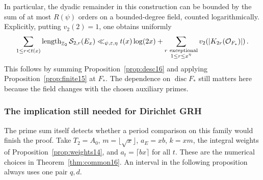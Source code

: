 \documentclass[a4paper,11pt]{article}
\theoremstyle{definition}
\theoremstyle{remark}
\newcommand{\ZZ}{\mathbb Z}\newcommand{\ord}{\operatorname{ord}}
\newcommand{\len}{\operatorname{length}}\newcommand{\Res}{\operatorname*{Res}}
\numberwithin{equation}{section}
\begin{document}
In particular, the dyadic remainder in this construction can be bounded by the sum of at most \(R(\psi)\) orders on a bounded-degree field, counted logarithmically. Explicitly, putting \(v_2(2)=1\), one obtains uniformly
\[
 \sum_{1\le r<t(x)}\len_{\ZZ_2}\mathcal S_{2,r}(E_x)
 \ll_{\psi,\eps,\eta} t(x)\log(2x)
   +\sum_{\substack{r\ {\rm exceptional}\\1\le r\le x^\eta}}
           v_2\!\left(|K_{2r}(\mathcal O_{F_*})|\right).
\]
This follows by summing Proposition~\ref{prop:desc16} and applying Proposition~\ref{prop:finite15} at \(F_*\). The dependence on \(\operatorname{disc}F_*\) still matters here because the field changes with the chosen auxiliary primes.

\subsubsection{The implication still needed for Dirichlet GRH}\label{nav:II-11}
The prime sum itself detects whether a period comparison on this family would finish the proof. Take \(T_2=A_0\), \(m=\lfloor\sqrt x\rfloor\), \(a_E=xb\), \(k=xm\), the integral weights of Proposition~\ref{prop:weights14}, and \(a_t=\lceil bx\rceil\) for all \(t\). These are the numerical choices in Theorem~\ref{thm:common16}. An interval in the following proposition always uses one pair \(q,d\).
\end{document}
